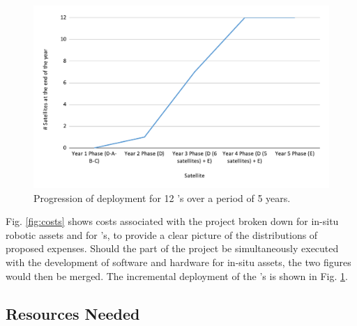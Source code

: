 \documentclass[12pt]{article}
\begin{document}
\begin{figure}
  \centering
  \includegraphics[scale=0.35]{fig/sat-progression.pdf}
  \caption{Progression of deployment for 12 \smle's over a period of 5
    years.}
  \label{fig:sat-prog}
\end{figure}

\newpage
Fig. \ref{fig:costs} shows costs associated with the project broken
down for in-situ robotic assets and for \smle's, to provide a clear
picture of the distributions of proposed expenses. Should the \sml
part of the project be simultaneously executed with the development of
software and hardware for in-situ assets, the two figures would then
be merged. The incremental deployment of the \smle's is shown in
Fig. \ref{fig:sat-prog}. 


\subsection{Resources Needed}
\end{document}
